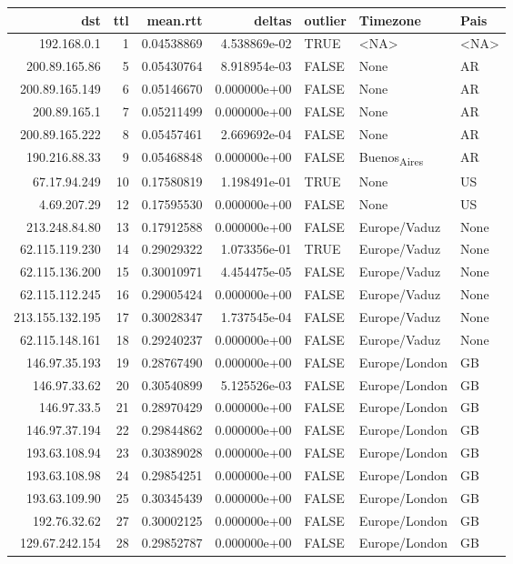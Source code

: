 \documentclass[11pt]{article}
\author{nsm}
\date{\today}
\title{}
\begin{document}
\tableofcontents

\begin{center}
\begin{tabular}{rrrrlll}
dst & ttl & mean.rtt & deltas & outlier & Timezone & Pais\\
\hline
192.168.0.1 & 1 & 0.04538869 & 4.538869e-02 & TRUE & <NA> & <NA>\\
200.89.165.86 & 5 & 0.05430764 & 8.918954e-03 & FALSE & None & AR\\
200.89.165.149 & 6 & 0.05146670 & 0.000000e+00 & FALSE & None & AR\\
200.89.165.1 & 7 & 0.05211499 & 0.000000e+00 & FALSE & None & AR\\
200.89.165.222 & 8 & 0.05457461 & 2.669692e-04 & FALSE & None & AR\\
190.216.88.33 & 9 & 0.05468848 & 0.000000e+00 & FALSE & Buenos\textsubscript{Aires} & AR\\
67.17.94.249 & 10 & 0.17580819 & 1.198491e-01 & TRUE & None & US\\
4.69.207.29 & 12 & 0.17595530 & 0.000000e+00 & FALSE & None & US\\
213.248.84.80 & 13 & 0.17912588 & 0.000000e+00 & FALSE & Europe/Vaduz & None\\
62.115.119.230 & 14 & 0.29029322 & 1.073356e-01 & TRUE & Europe/Vaduz & None\\
62.115.136.200 & 15 & 0.30010971 & 4.454475e-05 & FALSE & Europe/Vaduz & None\\
62.115.112.245 & 16 & 0.29005424 & 0.000000e+00 & FALSE & Europe/Vaduz & None\\
213.155.132.195 & 17 & 0.30028347 & 1.737545e-04 & FALSE & Europe/Vaduz & None\\
62.115.148.161 & 18 & 0.29240237 & 0.000000e+00 & FALSE & Europe/Vaduz & None\\
146.97.35.193 & 19 & 0.28767490 & 0.000000e+00 & FALSE & Europe/London & GB\\
146.97.33.62 & 20 & 0.30540899 & 5.125526e-03 & FALSE & Europe/London & GB\\
146.97.33.5 & 21 & 0.28970429 & 0.000000e+00 & FALSE & Europe/London & GB\\
146.97.37.194 & 22 & 0.29844862 & 0.000000e+00 & FALSE & Europe/London & GB\\
193.63.108.94 & 23 & 0.30389028 & 0.000000e+00 & FALSE & Europe/London & GB\\
193.63.108.98 & 24 & 0.29854251 & 0.000000e+00 & FALSE & Europe/London & GB\\
193.63.109.90 & 25 & 0.30345439 & 0.000000e+00 & FALSE & Europe/London & GB\\
192.76.32.62 & 27 & 0.30002125 & 0.000000e+00 & FALSE & Europe/London & GB\\
129.67.242.154 & 28 & 0.29852787 & 0.000000e+00 & FALSE & Europe/London & GB\\
\end{tabular}
\end{center}
\end{document}
